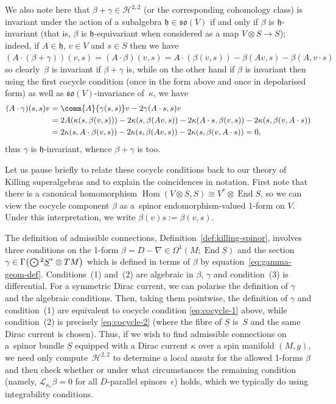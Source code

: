\documentclass[pdftex]{sigma}
\numberwithin{equation}{section}
\newcommand{\fh}{\mathfrak{h}}
\newcommand{\fso}{\mathfrak{so}}
\newcommand{\eL}{\mathscr{L}}
\newcommand{\cH}{\mathcal{H}}
\newcommand{\Sbundle}{\underline{S}}
\newcommand{\Odot}{\mathchoice{{\textstyle\bigodot}}{\bigodot}{\bigodot}{\bigodot}}
\newcommand{\1}{\mathbbm{1}}
\DeclareMathOperator{\End}{End}
\DeclareMathOperator{\Hom}{Hom}
\begin{document}
We also note here that $\beta+\gamma\in\cH^{2,2}$ (or the corresponding cohomology class) is invariant under the action of a subalgebra $\fh\in\fso(V)$ if and only if $\beta$ is $\fh$-invariant (that is, $\beta$ is $\fh$-equivariant when considered as a map $V\otimes S\to S$); indeed, if $A\in\fh$, $v\in V$ and $s\in S$ then we have~${(A\cdot(\beta+\gamma))(v,s) = (A\cdot\beta)(v,s) = A\cdot (\beta(v,s)) - \beta(Av,s) - \beta(A,v\cdot s)}
$
so clearly~$\beta$ is invariant if $\beta+\gamma$ is, while on the other hand if $\beta$ is invariant then using the first cocycle condition (once in the form above and once in depolarised form) as well as $\fso(V)$-invariance of~$\kappa$, we have
\begin{align*}
(A\cdot\gamma)(s,s)v &= \comm{A}{\gamma(s,s)}v - 2\gamma(A\cdot s,s)v \\
	&= 2A(\kappa(s,\beta(v,s))) - 2\kappa(s,\beta(Av,s)) - 2\kappa(A\cdot s,\beta(v,s)) - 2\kappa(s,\beta(v,A\cdot s)) \\
	&= 2\kappa(s,A\cdot\beta(v,s)) - 2\kappa(s,\beta(Av,s)) - 2\kappa(s,\beta(v,A\cdot s))= 0,
\end{align*}
thus $\gamma$ is $\fh$-invariant, whence $\beta+\gamma$ is too.

\begin{Remark}
	Let us pause briefly to relate these cocycle conditions back to our theory of Killing superalgebras and to explain the coincidences in notation. First note that there is a canonical homomorphism $\Hom(V\otimes S,S)\cong V^*\otimes\End S$, so we can view the cocycle component $\beta$ as a~spinor endomorphism-valued 1-form on $V$. Under this interpretation, we write $\beta(v)s:=\beta(v,s)$.
	
	The definition of admissible connections, Definition~\ref{def:killing-spinor}, involves three conditions on the 1-form $\beta=D-\nabla\in\Omega^1(M;\End\Sbundle)$ and the section $\gamma\in\Gamma\bigl(\Odot^2\Sbundle^*\otimes TM\bigr)$ which is defined in terms of $\beta$ by equation~\eqref{eq:gamma-geom-def}. Conditions~(1) and~(2) are algebraic in $\beta$, $\gamma$ and condition~(3) is differential. For a symmetric Dirac current, we can polarise the definition of $\gamma$ and the algebraic conditions. Then, taking them pointwise, the definition of $\gamma$ and condition~(1) are equivalent to cocycle condition \eqref{eq:cocycle-1} above, while condition~(2) is precisely \eqref{eq:cocycle-2} (where the fibre of $\Sbundle$ is~$S$ and the same Dirac current is chosen). Thus, if we wish to find admissible connections on a~spinor bundle $\Sbundle$ equipped with a Dirac current $\kappa$ over a spin manifold $(M,g)$, we need only compute~$\cH^{2,2}$ to determine a local ansatz for the allowed 1-forms $\beta$ and then check whether or under what circumstances the remaining condition (namely, $\eL_{\kappa_\epsilon}\beta=0$ for all $D$-parallel spinors~$\epsilon$) holds, which we typically do using integrability conditions.
\end{Remark}
\end{document}
